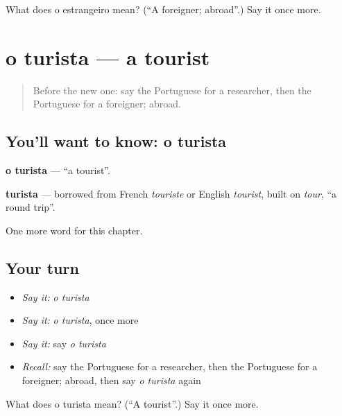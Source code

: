 \begin{tcolorbox}[breakable,colback=teal!4,colframe=teal!35!black,title={Before you move on}]
What does o estrangeiro mean? (\textquotedblleft{}A foreigner; abroad\textquotedblright{}.) Say it once more.
\end{tcolorbox}
\section[o turista]{o turista — a tourist}

\label{lesson:PT-C160-turista}



\begin{quote}
Before the new one: say the Portuguese for a researcher, then the Portuguese for a foreigner; abroad.
\end{quote}

\subsection*{You'll want to know: o turista}
\textbf{o turista} — \textquotedblleft{}a tourist\textquotedblright{}.

\begin{cousinweb}
\textbf{turista} — borrowed from French \emph{touriste} or English \emph{tourist}, built on \emph{tour}, \textquotedblleft{}a round trip\textquotedblright{}.
\end{cousinweb}

\begin{grammarlens}[title={What you've built}]
One more word for this chapter.
\end{grammarlens}

\subsection*{Your turn}
\begin{itemize}
\raggedright
  \item \emph{Say it:} \emph{o turista}
  \item \emph{Say it:} \emph{o turista}, once more
  \item \emph{Say it:} say \emph{o turista}
  \item \emph{Recall:} say the Portuguese for a researcher, then the Portuguese for a foreigner; abroad, then say \emph{o turista} again
\end{itemize}

\begin{tcolorbox}[breakable,colback=teal!4,colframe=teal!35!black,title={Before you move on}]
What does o turista mean? (\textquotedblleft{}A tourist\textquotedblright{}.) Say it once more.
\end{tcolorbox}
